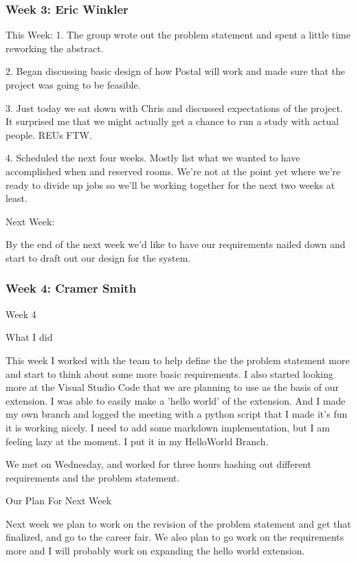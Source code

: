 \subsubsection{Week 3: Eric Winkler}

This Week: 
1. The group wrote out the problem statement and spent a little time reworking the abstract. 

2. Began discussing basic design of how Postal will work and made sure that the project was going to be feasible.

3. Just today we sat down with Chris and discussed expectations of the project. It surprised me that we might actually get a chance to run a study with actual people. REUs FTW. 

4. Scheduled the next four weeks. Mostly list what we wanted to have accomplished when and reserved rooms. We're not at the point yet where we're ready to divide up jobs so we'll be working together for the next two weeks at least.


Next Week: 

By the end of the next week we'd like to have our requirements nailed down and start to draft out our design for the system.

\subsubsection{Week 4: Cramer Smith}

Week 4

What I did

This week I worked with the team to help define the the problem statement more and start to think about some more basic requirements. I also started looking more at the Visual Studio Code that we are planning to use as the basis of our extension. I was able to easily make a 'hello world' of the extension. And I made my own branch and logged the meeting with a python script that I made it's fun it is working nicely. I need to add some markdown implementation, but I am feeling lazy at the moment. I put it in my HelloWorld Branch.

We met on Wednesday, and worked for three hours hashing out different requirements and the problem statement. 

Our Plan For Next Week

Next week we plan to work on the revision of the problem statement and get that finalized, and go to the career fair. We also plan to go work on the requirements more and I will probably work on expanding the hello world extension.




